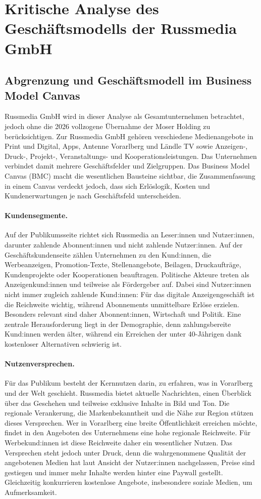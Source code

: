 \section*{Kritische Analyse des Geschäftsmodells der Russmedia GmbH}

\subsection*{Abgrenzung und Geschäftsmodell im Business Model Canvas}

Russmedia GmbH wird in dieser Analyse als Gesamtunternehmen betrachtet, jedoch ohne die 2026 vollzogene Übernahme der Moser Holding zu berücksichtigen. Zur Russmedia GmbH gehören verschiedene Medienangebote in Print und Digital, Apps, Antenne Vorarlberg und Ländle TV sowie Anzeigen-, Druck-, Projekt-, Veranstaltungs- und Kooperationsleistungen. Das Unternehmen verbindet damit mehrere Geschäftsfelder und Zielgruppen. Das Business Model Canvas (BMC) macht die wesentlichen Bausteine sichtbar, die Zusammenfassung in einem Canvas verdeckt jedoch, dass sich Erlöslogik, Kosten und Kundenerwartungen je nach Geschäftsfeld unterscheiden.

\paragraph*{Kundensegmente.}
Auf der Publikumsseite richtet sich Russmedia an Leser:innen und Nutzer:innen, darunter zahlende Abonnent:innen und nicht zahlende Nutzer:innen. Auf der Geschäftskundenseite zählen Unternehmen zu den Kund:innen, die Werbeanzeigen, Promotion-Texte, Stellenangebote, Beilagen, Druckaufträge, Kundenprojekte oder Kooperationen beauftragen. Politische Akteure treten als Anzeigenkund:innen und teilweise als Fördergeber auf. Dabei sind Nutzer:innen nicht immer zugleich zahlende Kund:innen: Für das digitale Anzeigengeschäft ist die Reichweite wichtig, während Abonnements unmittelbare Erlöse erzielen. Besonders relevant sind daher Abonnent:innen, Wirtschaft und Politik. Eine zentrale Herausforderung liegt in der Demographie, denn zahlungsbereite Kund:innen werden älter, während ein Erreichen der unter 40-Jährigen dank kostenloser Alternativen schwierig ist.

\paragraph*{Nutzenversprechen.}
Für das Publikum besteht der Kernnutzen darin, zu erfahren, was in Vorarlberg und der Welt geschieht. Russmedia bietet aktuelle Nachrichten, einen Überblick über das Geschehen und teilweise exklusive Inhalte in Bild und Ton. Die regionale Verankerung, die Markenbekanntheit und die Nähe zur Region stützen dieses Versprechen. Wer in Vorarlberg eine breite Öffentlichkeit erreichen möchte, findet in den Angeboten des Unternehmens eine hohe regionale Reichweite. Für Werbekund:innen ist diese Reichweite daher ein wesentlicher Nutzen. Das Versprechen steht jedoch unter Druck, denn die wahrgenommene Qualität der angebotenen Medien hat laut Ansicht der Nutzer:innen nachgelassen, Preise sind gestiegen und immer mehr Inhalte werden hinter eine Paywall gestellt. Gleichzeitig konkurrieren kostenlose Angebote, insbesondere soziale Medien, um Aufmerksamkeit.

